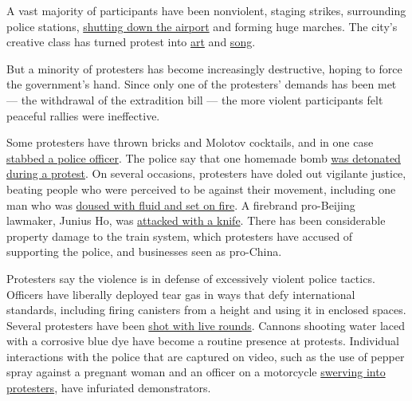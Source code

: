 A vast majority of participants have been nonviolent, staging strikes,
surrounding police stations,
\href{https://www.nytimes3xbfgragh.onion/2019/08/12/world/asia/hong-kong-airport-protest.html?module=inline}{shutting
down the airport} and forming huge marches. The city's creative class
has turned protest into
\href{https://www.nytimes3xbfgragh.onion/2019/10/11/world/asia/hong-kong-protest-art.html?module=inline}{art}
and
\href{https://www.nytimes3xbfgragh.onion/2019/09/12/world/asia/glory-to-hong-kong-anthem.html?module=inline}{song}.

But a minority of protesters has become increasingly destructive, hoping
to force the government's hand. Since only one of the protesters'
demands has been met --- the withdrawal of the extradition bill --- the
more violent participants felt peaceful rallies were ineffective.

Some protesters have thrown bricks and Molotov cocktails, and in one
case
\href{https://www.nytimes3xbfgragh.onion/2019/10/13/world/asia/hong-kong-protests-face-masks.html?module=inline}{stabbed
a police officer}. The police say that one homemade bomb
\href{https://www.nytimes3xbfgragh.onion/2019/10/14/world/asia/hong-kong-bomb-ied.html?module=inline}{was
detonated during a protest}. On several occasions, protesters have doled
out vigilante justice, beating people who were perceived to be against
their movement, including one man who was
\href{https://www.nytimes3xbfgragh.onion/2019/11/11/world/hong-kong-protests.html}{doused
with fluid and set on fire}. A firebrand pro-Beijing lawmaker, Junius
Ho, was
\href{https://www.nytimes3xbfgragh.onion/2019/11/05/world/asia/junius-ho-stabbed-hong-kong.html}{attacked
with a knife}. There has been considerable property damage to the train
system, which protesters have accused of supporting the police, and
businesses seen as pro-China.

Protesters say the violence is in defense of excessively violent police
tactics. Officers have liberally deployed tear gas in ways that defy
international standards, including firing canisters from a height and
using it in enclosed spaces. Several protesters have been
\href{https://www.nytimes3xbfgragh.onion/2019/11/10/world/asia/hong-kong-protests-general-strike.html}{shot
with live rounds}. Cannons shooting water laced with a corrosive blue
dye have become a routine presence at protests. Individual interactions
with the police that are captured on video, such as the use of pepper
spray against a pregnant woman and an officer on a motorcycle
\href{https://t.me/stuckwithyou/4553}{swerving into protesters}, have
infuriated demonstrators.

